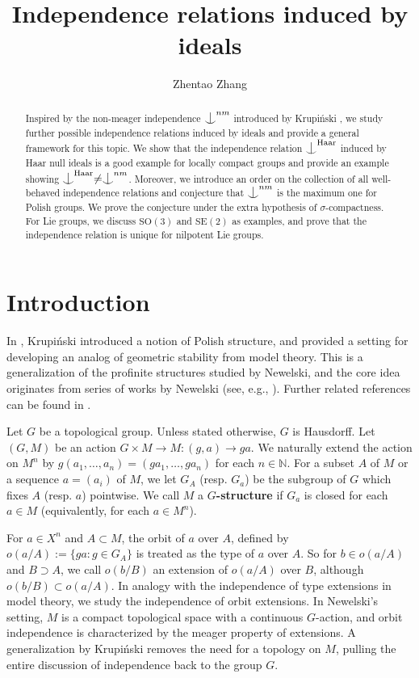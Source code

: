 \documentclass{article}
\newcommand{\N}{\mathbb{N}}
\newcommand{\HH}{\mathrm{Haar}}
\newcommand{\SO}{\mathrm{SO}}
\newcommand{\ind}{\mathrel{\raise0.2ex\hbox{\ooalign{\hidewidth$\vert$\hidewidth\cr\raise-0.9ex\hbox{$\smile$}}}}}
\begin{document}
\title{Independence relations induced by ideals}
\author{Zhentao Zhang}
\date{}
\maketitle

\begin{abstract}
Inspired by the non-meager independence $\ind^{nm}$ introduced by Krupi\'{n}ski \cite{KP}, we study further possible independence relations induced by ideals and provide a general framework for this topic. We show that the independence relation $\ind^\HH$ induced by Haar null ideals is a good example for locally compact groups and provide an example showing $\ind^\HH\neq \ind^{nm}$.
Moreover, we introduce an order on the collection of all well-behaved independence relations and conjecture that $\ind^{nm}$ is the maximum one for Polish groups. We prove the conjecture  under the extra hypothesis of $\sigma$-compactness. For Lie groups, we discuss $\SO(3)$ and 
$\mathrm{SE}(2)$ as examples, and prove that the independence relation is unique for nilpotent Lie groups. 
\end{abstract}


\section{Introduction}

In \cite{KP}, Krupi\'{n}ski introduced  a notion of Polish structure, and provided  a setting for developing an analog of geometric stability from model theory. This is a generalization of the profinite structures studied by Newelski, and the core idea originates from series of works by Newelski (see, e.g., \cite{L}). Further related references can be found in \cite{KP}. 

Let $G$ be a topological group. Unless stated otherwise, $G$ is Hausdorff.  Let $(G,M)$ be an action $G\times M\rightarrow M: (g,a)\rightarrow ga$. We naturally extend the action on $M^n$ by $g(a_1,\dots ,a_n)=(ga_1,\dots,g a_n)$ for each $n\in\N$.
For a subset $A$ of $M$ or a sequence $a=(a_i)$ of $M$, we let $G_A$ (resp. $G_a$) be the subgroup of $G$ which fixes $A$ (resp. $a$) pointwise. 
We call $M$ a \textbf{$G$-structure} if $G_a$ is closed for each $a\in M$ (equivalently, for each $a\in M^n$). 

For $a\in X^n$ and $A\subset M$, the orbit of $a$ over $A$, defined by $o(a/A):=\{ga:g\in G_A\}$ is treated as the type of $a$ over $A$. So for $b\in o(a/A)$ and $B\supset A$, we call $o(b/B)$ an extension of $o(a/A)$ over $B$, although $o(b/B)\subset o(a/A)$. In analogy with the independence of type extensions in model theory, we study the independence of orbit extensions. In Newelski's setting, $M$ is a compact topological space with a continuous 
$G$-action, and orbit independence is characterized by the meager property of extensions. A generalization by Krupi\'{n}ski removes the need for a topology on $M$, pulling the entire discussion of independence back to the group $G$. 
\end{document}
